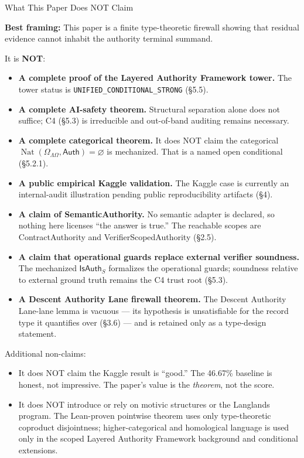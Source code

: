 \documentclass[
  10pt,
]{article}
\providecommand{\tightlist}{%
  \setlength{\itemsep}{0pt}\setlength{\parskip}{0pt}}
\providecommand{\tightlist}{%
  \setlength{\itemsep}{0pt}\setlength{\parskip}{0pt}}
\renewenvironment{quote}
  {\begin{leftbar}\small}
  {\end{leftbar}}
\DeclareRobustCommand{\texttt}[1]{{\paperSymbolFont\nolinkurl{#1}}}
\begin{document}
What This Paper Does NOT Claim

\begin{quote}
\textbf{Best framing:} This paper is a finite type-theoretic firewall showing that residual evidence cannot inhabit the authority terminal summand.
\end{quote}

It is \textbf{NOT}:

\begin{itemize}
\tightlist
\item
  \textbf{A complete proof of the Layered Authority Framework tower.} The tower status is \texttt{UNIFIED\_CONDITIONAL\_STRONG} (§5.5).
\item
  \textbf{A complete AI-safety theorem.} Structural separation alone does not suffice; C4 (§5.3) is irreducible and out-of-band auditing remains necessary.
\item
  \textbf{A complete categorical theorem.} It does NOT claim the categorical \protect\hypertarget{math-E0003-0172}{}{\(\operatorname{Nat}(\Omega_{\Lambda\Omega}, \mathsf{Auth}) = \varnothing\)} is mechanized. That is a named open conditional (§5.2.1).
\item
  \textbf{A public empirical Kaggle validation.} The Kaggle case is currently an internal-audit illustration pending public reproducibility artifacts (§4).
\item
  \textbf{A claim of SemanticAuthority.} No semantic adapter is declared, so nothing here licenses ``the answer is true.'' The reachable scopes are ContractAuthority and VerifierScopedAuthority (§2.5).
\item
  \textbf{A claim that operational guards replace external verifier soundness.} The mechanized \protect\hypertarget{math-E0033-0173}{}{\(\mathsf{IsAuth}_S\)} formalizes the operational guards; soundness relative to external ground truth remains the C4 trust root (§5.3).
\item
  \textbf{A Descent Authority Lane firewall theorem.} The Descent Authority Lane-lane lemma is vacuous --- its hypothesis is unsatisfiable for the record type it quantifies over (§3.6) --- and is retained only as a type-design statement.
\end{itemize}

Additional non-claims:

\begin{itemize}
\tightlist
\item
  It does NOT claim the Kaggle result is ``good.'' The 46.67\% baseline is honest, not impressive. The paper's value is the \emph{theorem}, not the score.
\item
  It does NOT introduce or rely on motivic structures or the Langlands program. The Lean-proven pointwise theorem uses only type-theoretic coproduct disjointness; higher-categorical and homological language is used only in the scoped Layered Authority Framework background and conditional extensions.
\end{itemize}
\end{document}
